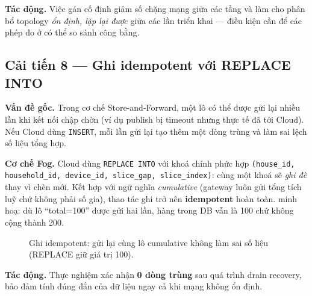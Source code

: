 \documentclass[13pt,a4paper]{report}
\newcommand{\code}[1]{\texttt{\small #1}}
\begin{document}
\textbf{Tác động.} Việc gán cố định giảm số chặng mạng giữa các tầng và làm cho
phân bổ topology \textit{ổn định, lặp lại được} giữa các lần triển khai --- điều
kiện cần để các phép đo ở  có thể so sánh công bằng.

\subsection{Cải tiến 8 --- Ghi idempotent với REPLACE INTO}

\textbf{Vấn đề gốc.} Trong cơ chế Store-and-Forward, một lô có thể được gửi lại
nhiều lần khi kết nối chập chờn (ví dụ publish bị timeout nhưng thực tế đã tới
Cloud). Nếu Cloud dùng \code{INSERT}, mỗi lần gửi lại tạo thêm một dòng trùng và
làm sai lệch số liệu tổng hợp.

\textbf{Cơ chế Fog.} Cloud dùng \code{REPLACE INTO} với khoá chính phức hợp
\code{(house\_id, household\_id, device\_id, slice\_gap, slice\_index)}: cùng một
khoá sẽ \textit{ghi đè} thay vì chèn mới. Kết hợp với ngữ nghĩa \textit{cumulative}
(gateway luôn gửi tổng tích luỹ chứ không phải số gia), thao tác ghi trở nên
\textbf{idempotent} hoàn toàn.  minh hoạ: dù lô ``total=100''
được gửi hai lần, hàng trong DB vẫn là 100 chứ không cộng thành 200.

\begin{figure}[H]
\centering
{}
\caption{Ghi idempotent: gửi lại cùng lô cumulative không làm sai số liệu (REPLACE giữ giá trị 100).}
\label{fig:imp-idem}
\end{figure}

\textbf{Tác động.} Thực nghiệm xác nhận \textbf{0 dòng trùng} sau quá trình drain
recovery, bảo đảm tính đúng đắn của dữ liệu ngay cả khi mạng không ổn định.
\end{document}
